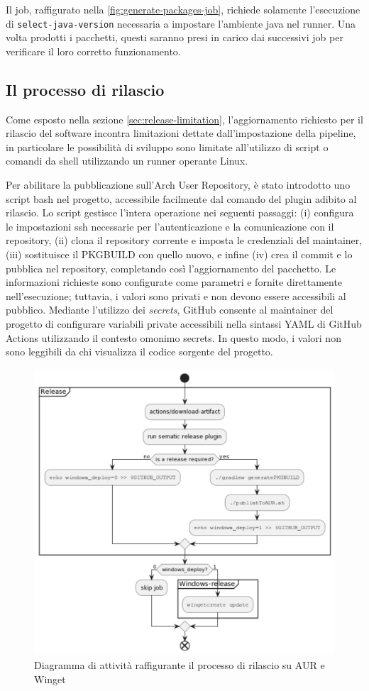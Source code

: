 Il job, raffigurato nella \cref{fig:generate-packages-job}, richiede solamente l'esecuzione di \texttt{select\--java\--version} necessaria a impostare l'ambiente java nel runner. Una volta prodotti i pacchetti, questi saranno presi in carico dai successivi job per verificare il loro corretto funzionamento.

\subsection{Il processo di rilascio}

Come esposto nella sezione \ref{sec:release-limitation}, l'aggiornamento richiesto per il rilascio del software incontra limitazioni dettate dall'impostazione della pipeline, in particolare le possibilità di sviluppo sono limitate all'utilizzo di script o comandi da shell utilizzando un runner operante Linux.

Per abilitare la pubblicazione sull'Arch User Repository, è stato introdotto uno script bash nel progetto, accessibile facilmente dal comando del plugin adibito al rilascio. Lo script gestisce l'intera operazione nei seguenti passaggi: (i) configura le impostazioni ssh necessarie per l'autenticazione e la comunicazione con il repository, (ii) clona il repository corrente e imposta le credenziali del maintainer, (iii) sostituisce il PKGBUILD con quello nuovo, e infine (iv) crea il commit e lo pubblica nel repository, completando così l'aggiornamento del pacchetto. Le informazioni richieste sono configurate come parametri e fornite direttamente nell'esecuzione; tuttavia, i valori sono privati e non devono essere accessibili al pubblico. Mediante l'utilizzo dei \textit{secrets}, GitHub consente al maintainer del progetto di configurare variabili private accessibili nella sintassi YAML di GitHub Actions utilizzando il contesto omonimo secrets. In questo modo, i valori non sono leggibili da chi visualizza il codice sorgente del progetto.

\begin{figure}[htb]
	\centering
	\includegraphics[width=.85\linewidth]{figures/release-flow.pdf}
	\caption{Diagramma di attività raffigurante il processo di rilascio su AUR e Winget}
	\label{fig:release-flow}
\end{figure}

